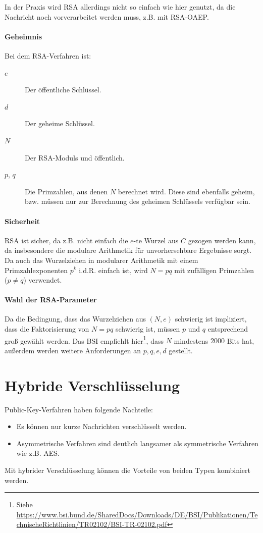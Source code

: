 \documentclass[a4paper, 11pt, accentcolor = tud3b]{tudreport}
\newcommand{\HREF}[1]{\href{#1}{#1}}
\begin{document}
					In der Praxis wird RSA allerdings nicht so einfach wie hier genutzt, da die Nachricht noch vorverarbeitet werden muss, z.B. mit RSA-OAEP.
				
				\paragraph{Geheimnis}
					Bei dem RSA-Verfahren ist:
					\begin{description}
						\item[\(e\)] Der öffentliche Schlüssel.
						\item[\(d\)] Der geheime Schlüssel.
						\item[\(N\)] Der RSA-Moduls und öffentlich.
						\item[\(p\), \(q\)] Die Primzahlen, aus denen \(N\) berechnet wird. Diese sind ebenfalls geheim, bzw. müssen nur zur Berechnung des geheimen Schlüssels verfügbar sein.
					\end{description}

                \paragraph{Sicherheit}
                    RSA ist sicher, da z.B. nicht einfach die \( e \)-te Wurzel aus \(C\) gezogen werden kann, da insbesondere die modulare Arithmetik für unvorhersehbare Ergebnisse sorgt. Da auch das Wurzelziehen in modularer Arithmetik mit einem Primzahlexponenten \(p^k\) i.d.R. einfach ist, wird \( N = pq \) mit zufälligen Primzahlen (\( p \neq q \)) verwendet.

                \paragraph{Wahl der RSA-Parameter}
                    Da die Bedingung, dass das Wurzelziehen aus \( (N, e) \) schwierig ist impliziert, dass die Faktorisierung von \( N = pq \) schwierig ist, müssen \(p\) und \(q\) entsprechend groß gewählt werden. Das BSI empfiehlt hier\footnote{Siehe \HREF{https://www.bsi.bund.de/SharedDocs/Downloads/DE/BSI/Publikationen/TechnischeRichtlinien/TR02102/BSI-TR-02102.pdf}}, dass \(N\) mindestens \(2000\) Bits hat, außerdem werden weitere Anforderungen an \( p, q, e, d \) gestellt.

        \section{Hybride Verschlüsselung}
            Public-Key-Verfahren haben folgende Nachteile:
            \begin{itemize}
            	\item Es können nur kurze Nachrichten verschlüsselt werden.
            	\item Asymmetrische Verfahren sind deutlich langsamer als symmetrische Verfahren wie z.B. AES.
            \end{itemize}
	        Mit hybrider Verschlüsselung können die Vorteile von beiden Typen kombiniert werden.
	        
\end{document}
